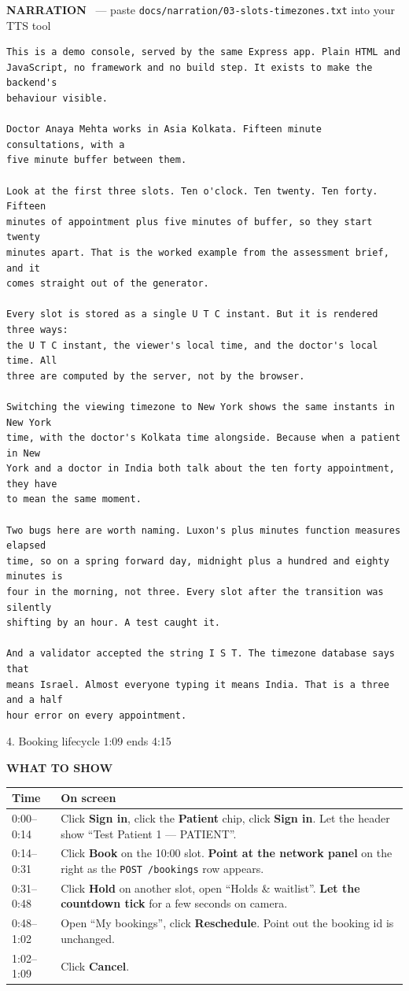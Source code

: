 \documentclass[11pt,a4paper]{article}
\newcommand{\segbar}[3]{%
  \vspace{12pt}
  \noindent\colorbox{accent}{\parbox{\dimexpr\textwidth-2\fboxsep}{%
    \color{white}\bfseries\large\strut #1 \hfill \normalsize #2 \quad ends #3}}
  \par\vspace{7pt}}
\newcommand{\showhdr}{\noindent\textcolor{showc}{\textbf{WHAT TO SHOW}}\par\vspace{2pt}}
\newcommand{\voicehdr}[1]{\vspace{4pt}\noindent\textcolor{voice}{\textbf{NARRATION}}%
  \ \textcolor{soft}{\small --- paste \texttt{docs/narration/#1.txt} into your TTS tool}\par\vspace{2pt}}
\begin{document}
\voicehdr{03-slots-timezones}
\begin{lstlisting}[style=tts]
This is a demo console, served by the same Express app. Plain HTML and
JavaScript, no framework and no build step. It exists to make the backend's
behaviour visible.

Doctor Anaya Mehta works in Asia Kolkata. Fifteen minute consultations, with a
five minute buffer between them.

Look at the first three slots. Ten o'clock. Ten twenty. Ten forty. Fifteen
minutes of appointment plus five minutes of buffer, so they start twenty
minutes apart. That is the worked example from the assessment brief, and it
comes straight out of the generator.

Every slot is stored as a single U T C instant. But it is rendered three ways:
the U T C instant, the viewer's local time, and the doctor's local time. All
three are computed by the server, not by the browser.

Switching the viewing timezone to New York shows the same instants in New York
time, with the doctor's Kolkata time alongside. Because when a patient in New
York and a doctor in India both talk about the ten forty appointment, they have
to mean the same moment.

Two bugs here are worth naming. Luxon's plus minutes function measures elapsed
time, so on a spring forward day, midnight plus a hundred and eighty minutes is
four in the morning, not three. Every slot after the transition was silently
shifting by an hour. A test caught it.

And a validator accepted the string I S T. The timezone database says that
means Israel. Almost everyone typing it means India. That is a three and a half
hour error on every appointment.
\end{lstlisting}

\segbar{4. Booking lifecycle}{1:09}{4:15}

\showhdr
\begin{longtable}{@{}p{1.6cm} p{13.4cm}@{}}
\toprule
\textbf{Time} & \textbf{On screen} \\
\midrule
\endhead
0:00--0:14 & Click \textbf{Sign in}, click the \textbf{Patient} chip, click \textbf{Sign in}.
             Let the header show ``Test Patient 1 --- PATIENT''. \\
0:14--0:31 & Click \textbf{Book} on the 10:00 slot. \textbf{Point at the network panel}
             on the right as the \texttt{POST /bookings} row appears. \\
0:31--0:48 & Click \textbf{Hold} on another slot, open ``Holds \& waitlist''.
             \textbf{Let the countdown tick} for a few seconds on camera. \\
0:48--1:02 & Open ``My bookings'', click \textbf{Reschedule}. Point out the booking id
             is unchanged. \\
1:02--1:09 & Click \textbf{Cancel}. \\
\bottomrule
\end{longtable}
\end{document}
